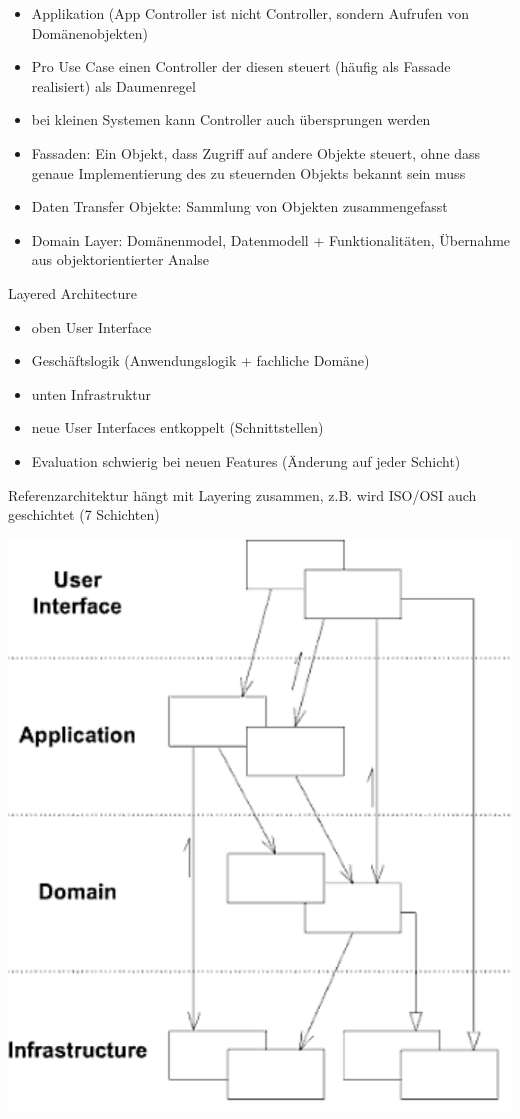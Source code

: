\documentclass[paper=a4, fontsize=11pt]{scrartcl} %
\numberwithin{equation}{section} %
\numberwithin{figure}{section} %
\numberwithin{table}{section} %
\begin{document}
\begin{itemize}
\begin{itemize}
    \item Applikation (App Controller ist nicht Controller, sondern Aufrufen von Domänenobjekten)
    \item Pro Use Case einen Controller der diesen steuert (häufig als Fassade realisiert) als Daumenregel
    \item bei kleinen Systemen kann Controller auch übersprungen werden
    \item Fassaden: Ein Objekt, dass Zugriff auf andere Objekte steuert, ohne dass genaue Implementierung des zu steuernden Objekts bekannt sein muss
    \item Daten Transfer Objekte: Sammlung von Objekten zusammengefasst
    \item Domain Layer: Domänenmodel, Datenmodell + Funktionalitäten, Übernahme aus objektorientierter Analse
  \end{itemize}
  \begin{minipage}{.5\textwidth}
    \item Layered Architecture
    \begin{itemize}
      \item oben User Interface
      \item Geschäftslogik (Anwendungslogik + fachliche Domäne)
      \item unten Infrastruktur
      \item neue User Interfaces entkoppelt (Schnittstellen)
      \item Evaluation schwierig bei neuen Features (Änderung auf jeder Schicht)
    \end{itemize}
    \item Referenzarchitektur hängt mit Layering zusammen, z.B. wird ISO/OSI auch geschichtet (7 Schichten)
  \end{minipage}
  \begin{minipage}{.5\textwidth}
    \includegraphics[width=\textwidth]{imgs/layered}

\end{minipage}
\end{itemize}
\end{document}
